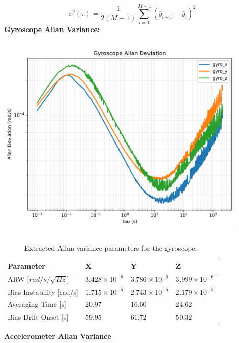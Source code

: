 \documentclass[10pt]{article}
\begin{document}
$$
\sigma^2(\tau) = \frac{1}{2(M-1)}\sum_{i=1}^{M-1}{(\bar{y}_{i+1} - \bar{y}_i)^2}
$$
\textbf{Gyroscope Allan Variance:}

\begin{center}
    \includegraphics[width=12cm, height=10cm]{gyro_allan.png} %
\end{center}

\begin{table}[h!]
    \centering
    \begin{tabularx}{\linewidth}{@{}l XXX@{}}
    \toprule
    \textbf{Parameter} & \textbf{X} & \textbf{Y} & \textbf{Z} \\
    \midrule
    ARW [$rad/s/\sqrt{Hz}$] & $3.428 \times 10^{-6}$ & $3.786 \times 10^{-6}$ & $3.999 \times 10^{-6}$ \\
    Bias Instability [rad/s] & $1.715 \times 10^{-5}$ & $2.743 \times 10^{-5}$ & $2.179 \times 10^{-5}$ \\
    Averaging Time [s] & 20.97 & 16.60 & 24.62 \\
    Bias Drift Onset [s] & $59.95$ & $61.72$ & $50.32$ \\
    \bottomrule
    \end{tabularx}
    \caption{Extracted Allan variance parameters for the gyroscope.}
\end{table}
    

\textbf{Accelerometer Allan Variance}
\end{document}
